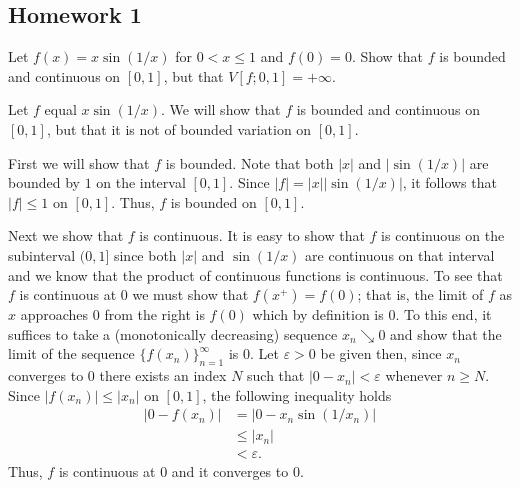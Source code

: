 \subsection{Homework 1}
\begin{problem}
  Let $f(x)=x\sin(1/x)$ for $0<x\leq 1$ and $f(0)=0$. Show that $f$ is
  bounded and continuous on $[0,1]$, but that $V[f;0,1]=+\infty$.
\end{problem}
\begin{solution}
  Let $f$ equal $x\sin(1/x)$. We will show that $f$ is bounded and
  continuous on $[0,1]$, but that it is not of bounded variation on
  $[0,1]$.

  First we will show that $f$ is bounded. Note that both $|x|$ and
  $|\sin(1/x)|$ are bounded by $1$ on the interval $[0,1]$. Since
  $|f|=|x||\sin(1/x)|$, it follows that $|f|\leq 1$ on $[0,1]$. Thus, $f$
  is bounded on $[0,1]$.

  Next we show that $f$ is continuous. It is easy to show that $f$ is
  continuous on the subinterval $(0,1]$ since both $|x|$ and $\sin(1/x)$
  are continuous on that interval and we know that the product of
  continuous functions is continuous. To see that $f$ is continuous at $0$
  we must show that $f(x^+)=f(0)$; that is, the limit of $f$ as $x$
  approaches $0$ from the right is $f(0)$ which by definition is $0$. To
  this end, it suffices to take a (monotonically decreasing) sequence
  $x_n\searrow 0$ and show that the limit of the sequence
  ${\{f(x_n)\}}_{n=1}^\infty$ is $0$. Let $\varepsilon>0$ be given then,
  since $x_n$ converges to $0$ there exists an index $N$ such that
  $|0-x_n|<\varepsilon$ whenever $n\geq N$. Since $|f(x_n)|\leq |x_n|$ on
  $[0,1]$, the following inequality holds
  \begin{align*}
    |0-f(x_n)|
    &=\left|0-x_n\sin(1/x_n)\right|\\
    &\leq |x_n|\\
    &<\varepsilon.
  \end{align*}
  Thus, $f$ is continuous at $0$ and it converges to $0$.


\end{solution}
